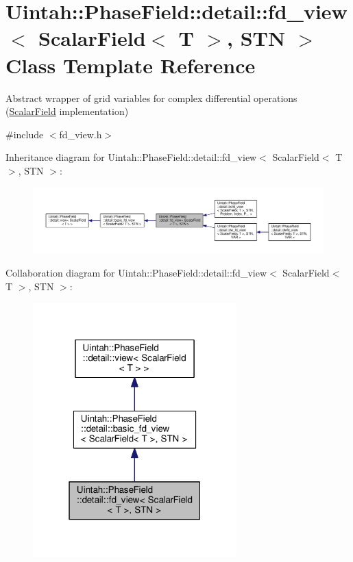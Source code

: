 \hypertarget{classUintah_1_1PhaseField_1_1detail_1_1fd__view_3_01ScalarField_3_01T_01_4_00_01STN_01_4}{}\section{Uintah\+:\+:Phase\+Field\+:\+:detail\+:\+:fd\+\_\+view$<$ Scalar\+Field$<$ T $>$, S\+TN $>$ Class Template Reference}
\label{classUintah_1_1PhaseField_1_1detail_1_1fd__view_3_01ScalarField_3_01T_01_4_00_01STN_01_4}


Abstract wrapper of grid variables for complex differential operations (\hyperlink{structUintah_1_1PhaseField_1_1ScalarField}{Scalar\+Field} implementation)  




{\ttfamily \#include $<$fd\+\_\+view.\+h$>$}



Inheritance diagram for Uintah\+:\+:Phase\+Field\+:\+:detail\+:\+:fd\+\_\+view$<$ Scalar\+Field$<$ T $>$, S\+TN $>$\+:\nopagebreak
\begin{figure}[H]
\begin{center}
\leavevmode
\includegraphics[width=350pt]{classUintah_1_1PhaseField_1_1detail_1_1fd__view_3_01ScalarField_3_01T_01_4_00_01STN_01_4__inherit__graph}
\end{center}
\end{figure}


Collaboration diagram for Uintah\+:\+:Phase\+Field\+:\+:detail\+:\+:fd\+\_\+view$<$ Scalar\+Field$<$ T $>$, S\+TN $>$\+:\nopagebreak
\begin{figure}[H]
\begin{center}
\leavevmode
\includegraphics[width=223pt]{classUintah_1_1PhaseField_1_1detail_1_1fd__view_3_01ScalarField_3_01T_01_4_00_01STN_01_4__coll__graph}
\end{center}
\end{figure}
